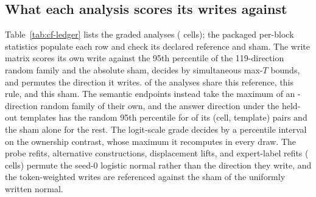\documentclass{article}
\begin{document}
\subsection{What each analysis scores its writes against}
\label{app:cf-ledger}

Table~\ref{tab:cf-ledger} lists the \cfLedgerAnalyses{} graded analyses (\cfLedgerCells{} cells); the packaged per-block statistics populate each row and check its declared reference and sham. The write matrix scores its own write against the 95th percentile of the 119-direction random family and the absolute sham, decides by simultaneous max-$T$ bounds, and permutes the direction it writes. \cfLedgerFullReference{} of the analyses share this reference, \cfLedgerMaxT{} this rule, and \cfLedgerOwnSham{} this sham. The semantic endpoints instead take the maximum of an \cfSemLedgerRandom{}-direction random family of their own, and the answer direction under the held-out templates has the random 95th percentile for \cfAnsdirtRefPairs{} of its \cfAnsdirtLedgerPairs{} (cell, template) pairs and the sham alone for the rest. The logit-scale grade decides by a percentile interval on the ownership contrast, whose maximum it recomputes in every draw. The probe refits, alternative constructions, displacement lifts, and expert-label refits (\cfLedgerSeedShamCells{} cells) permute the seed-0 logistic normal rather than the direction they write, and the token-weighted writes are referenced against the sham of the uniformly written normal.
\end{document}
